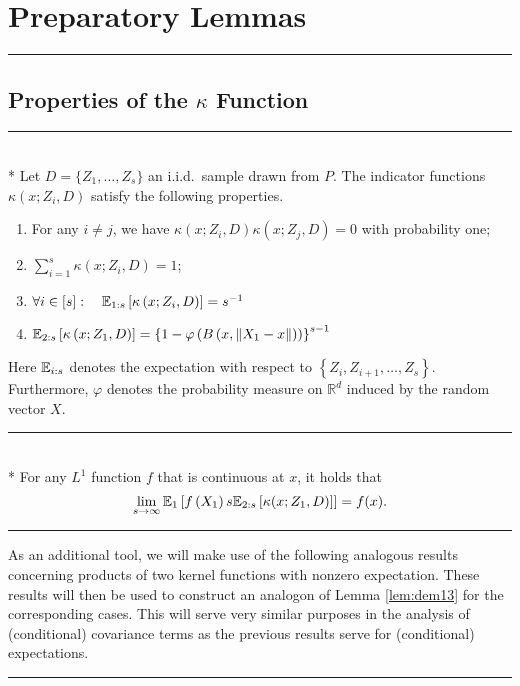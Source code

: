 \section{Preparatory Lemmas}
\hrule

\subsection{Properties of the $\kappa$ Function}
\hrule

\begin{lem}\label{lem:dem12}\mbox{}\\*
	Let $D = \{Z_1, \dotsc, Z_s\}$ an i.i.d.\ sample drawn from $P$.
	The indicator functions $\kappa\left(x; Z_{i}, D\right)$ satisfy the following properties.
	\begin{enumerate}
		\item For any $i \neq j$, we have $\kappa\left(x; Z_{i}, D\right) \kappa\left(x;
			      Z_{j}, D\right)=0$ with probability one;
		\item $\sum_{i=1}^{s} \kappa\left(x; Z_{i}, D\right)=1$;
		\item $\forall i \in [s]: \quad \mathbb{E}_{1:s}\left[\kappa\left(x; Z_{i}, D\right)\right]=s^{-1}$
		\item $\mathbb{E}_{2: s}\left[\kappa\left(x; Z_1, D\right)\right]
			      = \left\{1-\varphi\left(B\left(x,\left\|X_1-x\right\|\right)\right)\right\}^{s-1}$
	\end{enumerate}
	Here $\mathbb{E}_{i: s}$ denotes the expectation with respect to $\left\{Z_{i}, Z_{i+1}, \dotsc, Z_s\right\}$.
	Furthermore, $\varphi$ denotes the probability measure on $\mathbb{R}^{d}$ induced by the random vector $X$.
\end{lem}

\hrule

\begin{lem}\label{lem:dem13}\mbox{}\\*
	For any $L^1$ function $f$ that is continuous at $x$, it holds that
	\begin{equation}
		\lim _{s \rightarrow \infty} \mathbb{E}_{1}\left[f\left(X_1\right) s \mathbb{E}_{2:s}\left[\kappa(x; Z_1, D)\right]\right]
		= f(x).
	\end{equation}
\end{lem}

\hrule

As an additional tool, we will make use of the following analogous results concerning products of two kernel functions with nonzero expectation.
These results will then be used to construct an analogon of Lemma \ref{lem:dem13} for the corresponding cases.
This will serve very similar purposes in the analysis of (conditional) covariance terms as the previous results serve for (conditional) expectations.
\vspace{0.5cm}
\hrule

